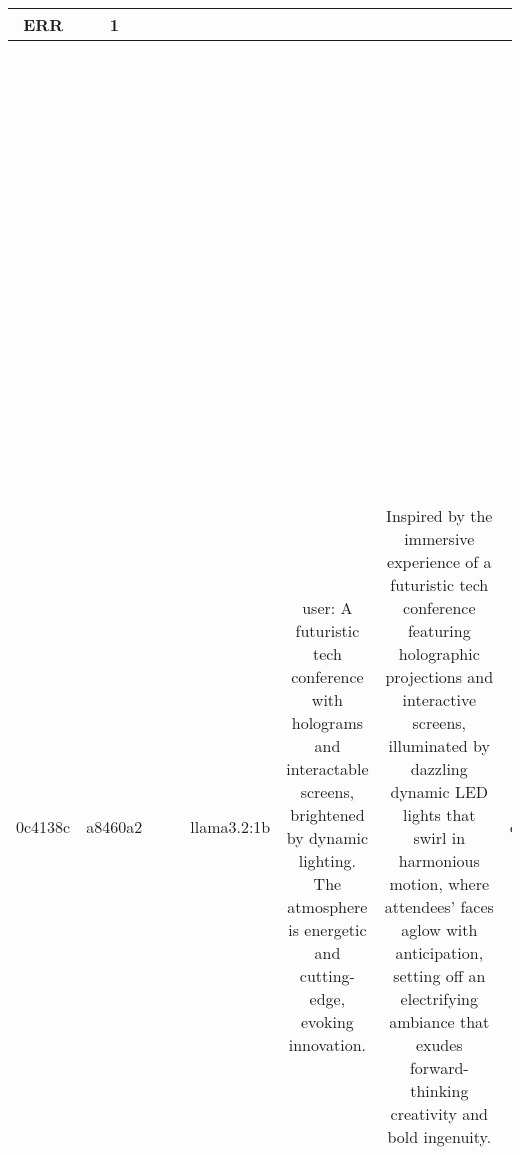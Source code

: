 \begin{table}[h!]
\begin{tabular}{|c|c|c|c|c|c|c|c|c|c|}
ERR & 1\\
\hline
0c4138c & a8460a2 &  &  & llama3.2:1b & user: A futuristic tech conference with holograms and interactable screens, brightened by dynamic lighting. The atmosphere is energetic and cutting-edge, evoking innovation. & Inspired by the immersive experience of a futuristic tech conference featuring holographic projections and interactive screens, illuminated by dazzling dynamic LED lights that swirl in harmonious motion, where attendees' faces aglow with anticipation, setting off an electrifying ambiance that exudes forward-thinking creativity and bold ingenuity. & ok & The given output is a single paragraph and does not exceed 80 words. The description begins by focusing on the subject, which in this case seems to be a futuristic tech conference with holographic projections and interactive screens. It mentions the lighting as dynamic LED lights and suggests a background with faces of attendees. The feeling intended to be conveyed is anticipation and forward-thinking creativity. The output appears to comply with the chatbot description as each of the specified elements is present—subjects and characteristics, timing and lighting, background description, and the conveyed feeling are all addressed within a detailed prompt for AI photo generation that stays within the length and structure guidelines.

OK & 1\\
\hline
1287f9d & a8460a2 &  &  & llama3.2:1b & user: A serene lakeside with a small wooden pier at dawn, a single rowboat tied gently. The misty ambiance evokes solitude and peaceful reflection. & To generate this AI photo prompt:

"Imagine a serene lakeside landscape with a minimalistic wooden pier, situated majestically in the distant morning hours - early rise to greet the golden light; capturing a single person standing serenely amidst the mist, gently rowing a pristine, handcrafted rowboat, as gentle lapping water caresses the shore. Emphasize solitude by using soft focus and muted color palette, blending tranquil blue hues with subtle warm tones, conveying an aura of quiet contemplation." & ok & The chatbot output is a single paragraph and does not exceed 80 words, which aligns with the description requirements. The output provides details focusing on the subjects including "a single person" in a "handcrafted rowboat," with characteristics of "standing serenely" and "gently rowing." It describes the timing and lighting as "morning hours - early rise to greet the golden light" and includes a detailed description of the background with "serene lakeside landscape," "minimalistic wooden pier," and "gentle lapping water caresses the shore." The image is meant to evoke the feeling of "quiet contemplation" with "soft focus" and a "muted color palette," which conveys a clear artistic insight and suggests an impactful image. Overall, it complies with the chatbot description requirements.


\end{tabular}
\end{table}

